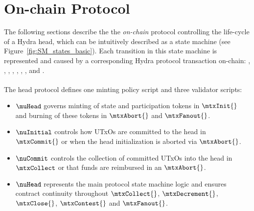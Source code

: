 \clearpage
\section{On-chain Protocol}\label{sec:on-chain}


\noindent The following sections describe the the \emph{on-chain} protocol controlling the
life-cycle of a Hydra head, which can be intuitively described as a state
machine (see Figure~\ref{fig:SM_states_basic}). Each transition in this state
machine is represented and caused by a corresponding Hydra protocol transaction
on-chain: \mtxInit{}, \mtxCom{}, \mtxAbort{}, \mtxCollect{}, \mtxDecrement{},
\red{\mtxIncrement{},} \mtxClose{}, \mtxContest{}, and \mtxFanout{}. \\

\noindent {} \\


\noindent The head protocol defines one minting policy script and three
validator scripts:
\begin{itemize}
	\item $\muHead$ governs minting of state and participation tokens in
	      $\mtxInit{}$ and burning of these tokens in $\mtxAbort{}$ and
	      $\mtxFanout{}$.
	\item $\nuInitial$ controls how UTxOs are committed to the head in
	      $\mtxCommit{}$ or when the head initialization is aborted via
	      $\mtxAbort{}$.
	\item $\nuCommit$ controls the collection of committed UTxOs into the head in
	      $\mtxCollect$ or that funds are reimbursed in an $\mtxAbort{}$.
	\item $\nuHead$ represents the main protocol state machine logic and ensures
				contract continuity throughout $\mtxCollect{}$, $\mtxDecrement{}$,
				\red{\mtxIncrement{},} $\mtxClose{}$, $\mtxContest{}$ and
				$\mtxFanout{}$.
\end{itemize}

